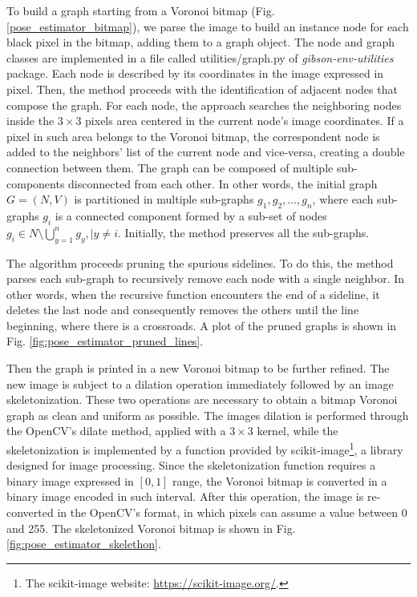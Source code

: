To build a graph starting from a Voronoi bitmap (Fig. \ref{pose_estimator_bitmap}), we parse the image to build an instance node for each black pixel in the bitmap, adding them to a graph object. The \textsf{node} and \textsf{graph} classes are implemented in a file called \textsf{utilities/graph.py} of \textit{gibson-env-utilities} package. Each node is described by its coordinates in the image expressed in pixel. Then, the method proceeds with the identification of adjacent nodes that compose the graph. For each node, the approach searches the neighboring nodes inside the $3 \times 3$ pixels area centered in the current node's image coordinates. If a pixel in such area belongs to the Voronoi bitmap, the correspondent node is added to the neighbors' list of the current node and vice-versa, creating a double connection between them. The graph can be composed of multiple sub-components disconnected from each other. In other words, the initial graph $G = (N, V)$ is partitioned in multiple sub-graphs $g_1, g_2, ..., g_n$, where each sub-graphs $g_i$ is a connected component formed by a sub-set of nodes $g_i \in N \setminus \bigcup_{y=1}^{n} g_{y}, \mid y  \neq i$. Initially, the method preserves all the sub-graphs. 

The algorithm proceeds pruning the spurious sidelines. To do this, the method parses each sub-graph to recursively remove each node with a single neighbor. In other words, when the recursive function encounters the end of a sideline, it deletes the last node and consequently removes the others until the line beginning, where there is a crossroads. A plot of the pruned graphs is shown in Fig. \ref{fig:pose_estimator_pruned_lines}. 

Then the graph is printed in a new Voronoi bitmap to be further refined. The new image is subject to a dilation operation immediately followed by an image skeletonization. These two operations are necessary to obtain a bitmap Voronoi graph as clean and uniform as possible. The images dilation is performed through the OpenCV's \textsf{dilate} method, applied with a $3 \times 3$ kernel, while the skeletonization is implemented by a function provided by scikit-image\footnote{The scikit-image website: \url{https://scikit-image.org/}.}, a library designed for image processing.
Since the skeletonization function requires a binary image expressed in $[0, 1]$ range, the Voronoi bitmap is converted in a binary image encoded in such interval. After this operation, the image is re-converted in the OpenCV's format, in which pixels can assume a value between 0 and 255. The skeletonized Voronoi bitmap is shown in Fig. \ref{fig:pose_estimator_skelethon}. 

